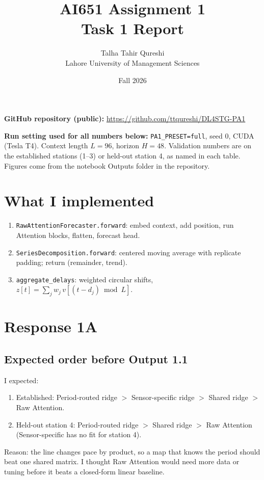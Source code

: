\documentclass[11pt,a4paper]{article}
\title{AI651 Assignment 1\\Task 1 Report}
\author{Talha Tahir Qureshi\\Lahore University of Management Sciences}
\date{Fall 2026}
\begin{document}
\maketitle

\noindent\textbf{GitHub repository (public):}
\url{https://github.com/ttqureshi/DL4STG-PA1}

\vspace{0.5em}
\noindent\textbf{Run setting used for all numbers below:}
\texttt{PA1\_PRESET=full}, seed 0, CUDA (Tesla T4). Context length $L=96$, horizon $H=48$.
Validation numbers are on the established stations (1--3) or held-out station 4, as named in each table.
Figures come from the notebook Outputs folder in the repository.

\section*{What I implemented}
\begin{enumerate}
  \item \texttt{RawAttentionForecaster.forward}: embed context, add position, run Attention blocks, flatten, forecast head.
  \item \texttt{SeriesDecomposition.forward}: centered moving average with replicate padding; return (remainder, trend).
  \item \texttt{aggregate\_delays}: weighted circular shifts, $z[t]=\sum_j w_j\,v[(t-d_j)\bmod L]$.
\end{enumerate}

\section{Response 1A}
\subsection*{Expected order before Output 1.1}
I expected:
\begin{enumerate}
  \item Established: Period-routed ridge $>$ Sensor-specific ridge $>$ Shared ridge $>$ Raw Attention.
  \item Held-out station 4: Period-routed ridge $>$ Shared ridge $>$ Raw Attention (Sensor-specific has no fit for station 4).
\end{enumerate}
Reason: the line changes pace by product, so a map that knows the period should beat one shared matrix. I thought Raw Attention would need more data or tuning before it beats a closed-form linear baseline.
\end{document}
